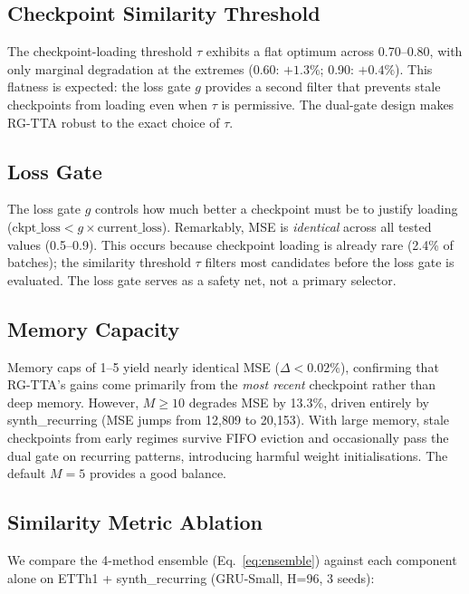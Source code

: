 \documentclass[11pt,a4paper]{article}
\begin{document}
\subsection{Checkpoint Similarity Threshold}

The checkpoint-loading threshold $\tau$ exhibits a flat optimum across 0.70--0.80, with only marginal degradation at the extremes (0.60: $+1.3\%$; 0.90: $+0.4\%$). This flatness is expected: the loss gate $g$ provides a second filter that prevents stale checkpoints from loading even when $\tau$ is permissive. The dual-gate design makes RG-TTA robust to the exact choice of $\tau$.

\subsection{Loss Gate}

The loss gate $g$ controls how much better a checkpoint must be to justify loading ($\text{ckpt\_loss} < g \times \text{current\_loss}$). Remarkably, MSE is \emph{identical} across all tested values (0.5--0.9). This occurs because checkpoint loading is already rare (2.4\% of batches); the similarity threshold $\tau$ filters most candidates before the loss gate is evaluated. The loss gate serves as a safety net, not a primary selector.

\subsection{Memory Capacity}

Memory caps of 1--5 yield nearly identical MSE ($\Delta < 0.02\%$), confirming that RG-TTA's gains come primarily from the \emph{most recent} checkpoint rather than deep memory. However, $M \geq 10$ degrades MSE by 13.3\%, driven entirely by synth\_recurring (MSE jumps from 12{,}809 to 20{,}153). With large memory, stale checkpoints from early regimes survive FIFO eviction and occasionally pass the dual gate on recurring patterns, introducing harmful weight initialisations. The default $M = 5$ provides a good balance.

\subsection{Similarity Metric Ablation}
\label{sec:sim_metric_ablation}

We compare the 4-method ensemble (Eq.~\ref{eq:ensemble}) against each component alone on ETTh1 + synth\_recurring (GRU-Small, H=96, 3 seeds):
\end{document}
